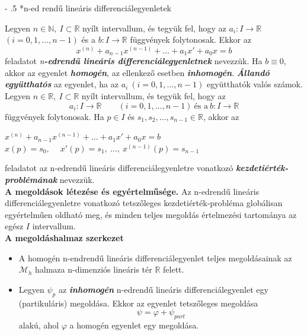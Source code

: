 \documentclass[12pt,margin=0px]{article}
\makeatletter
\renewcommand\paragraph{%
	\@startsection{paragraph}{4}{0mm}%
	{-\baselineskip}%
	{.5\baselineskip}%
	{\normalfont\normalsize\bfseries}}
\makeatother
\begin{document}
    \paragraph*{n-ed rendű lineáris differenciálegyenletek}

    \noindent Legyen $n \in \mathbb{N},\ I \subset \mathbb{R}$ nyílt intervallum, és tegyük fel, hogy az $a_i: I \to \mathbb{R}$ $(i = 0,1, \ldots, n-1)$ és a $b:I \to \mathbb{R}$ függvények folytonosak. Ekkor az
    \[
        x^{(n)} + a_{n-1}x^{(n-1)} + \ldots + a_{1}x' + a_{0}x = b
    \]
    feladatot \emph{n}\textbf{\emph{-edrendű lineáris differenciálegyenletnek}} nevezzük. Ha $b \equiv 0$, akkor az egyenlet \textbf{\emph{homogén}}, az ellenkező esetben \textbf{\emph{inhomogén}}. \textbf{\emph{Állandó együtthatós}} az egyenlet, ha az $a_i\ (i = 0, 1, \ldots, n-1)$ együtthatók valós számok.\\

    \noindent Legyen $n \in \mathbb{R},\ I \subset \mathbb{R}$ nyílt intervallum, és tegyük fel, hogy az
    \[
        a_i : I \to \mathbb{R} \qquad (i = 0, 1, \ldots, n-1)\ \text{és a}\ b: I \to \mathbb{R}
    \]
    függvények folytonosak. Ha $p \in I$ és $s_1, s_2, \ldots, s_{n-1} \in \mathbb{R}$, akkor az
    \begin{center}
        $x^{(n)} + a_{n-1}x^{(n-1)} + \ldots + a_{1}x' + a_{0}x = b$\\
        $x(p) = s_0,\ \quad x'(p) = s_1,\ \ldots,\ x^{(n-1)}(p) = s_{n-1}$
    \end{center}
    feladatot az n-edrendű lineáris differenciálegyenletre vonatkozó \textbf{\emph{kezdetiérték-problémának}} nevezzük.\\

    \noindent \textbf{A megoldások létezése és egyértelműsége.} Az n-edrendű lineáris differenciálegyenletre vonatkozó tetszőleges kezdetiérték-probléma globálisan egyértelműen oldható meg, és minden teljes megoldás értelmezési tartománya az egész $I$ intervallum.\\
\newpage
    \noindent \textbf{A megoldáshalmaz szerkezet}
    \begin{itemize}
        \item A homogén n-endrendű lineáris differenciálegyenlet teljes megoldásainak az $\mathcal{M}_{h}$ halmaza n-dimenziós lineáris tér $\mathbb{R}$ felett.
        \item Legyen $\psi_{p}$ az \textbf{\emph{inhomogén}} n-edrendű lineáris differenciálegyenlet egy (partikuláris) megoldása. Ekkor az egyenlet tetszőleges megoldása
        \[
            \psi = \varphi + \psi_{part}
        \]
        alakú, ahol $\varphi$ a homogén egyenlet egy megoldása.
    \end{itemize}
\end{document}
